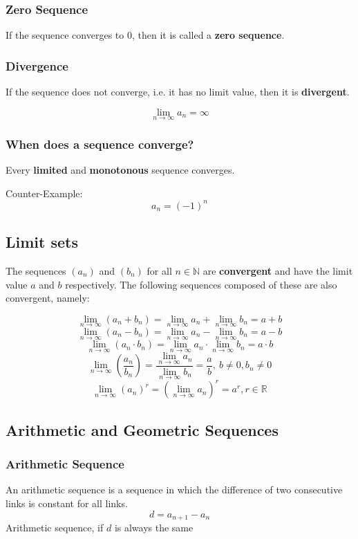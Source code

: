 \documentclass{book}
\begin{document}
\subsubsection{Zero Sequence}
If the sequence converges to $0$, then it is called a \textbf{zero sequence}.

\subsubsection{Divergence}
If the sequence does not converge, i.e. it has no limit value, then it is \textbf{divergent}.

\[
\lim\limits_{n\to \infty} a_{n} = \infty
\]

\subsubsection{When does a sequence converge?}
Every \textbf{limited} and \textbf{monotonous} sequence converges.

Counter-Example:
\[
  a_n = (-1)^n
\]

\subsection{Limit sets}
The sequences $(a_n)$ and $(b_n)$ for all $n \in \mathbb{N}$ are \textbf{convergent} and have the limit value $a$ and $b$ respectively. The following sequences composed of these are also convergent, namely:

\[
\lim\limits_{n\to \infty} (a_{n} + b_{n}) = \lim\limits_{n\to \infty} a_{n} + \lim\limits_{n\to \infty} b_{n} = a + b
\]
\[
\lim\limits_{n\to \infty} (a_{n} - b_{n}) = \lim\limits_{n\to \infty} a_{n} - \lim\limits_{n\to \infty} b_{n} = a - b
\]
\[
\lim\limits_{n\to \infty} (a_{n} \cdot b_{n}) = \lim\limits_{n\to \infty} a_{n} \cdot \lim\limits_{n\to \infty} b_{n} = a \cdot b
\]
\[
\lim\limits_{n\to \infty}(\frac{a_{n}}{b_{n}}) = \frac{\lim\limits_{n\to \infty} a_{n}}{\lim\limits_{n\to \infty} b_{n}} = \frac{a}{b}, \: b \ne 0, b_{n} \ne 0
\]
\[
\lim\limits_{n\to\infty} (a_{n})^{r} = \left(\lim\limits_{n\to\infty}a_{n}\right)^{r} = a^{r}, r \in \mathbb{R}
\]

\subsection{Arithmetic and Geometric Sequences}
\subsubsection{Arithmetic Sequence}
An arithmetic sequence is a sequence in which the difference of two consecutive links is constant for all links.
\[
  d = a_{n+1} - a_{n}
\]
Arithmetic sequence, if $d$ is always the same
\end{document}
